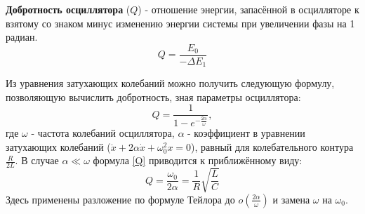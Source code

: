 \documentclass[15pt,a5paper,reqno]{article}
\begin{document}
    \textbf{Добротность осциллятора} ($Q$) - отношение энергии, запасённой в осцилляторе к взятому со знаком минус изменению энергии системы при увеличении фазы на 1 радиан.
    \begin{equation}\label{Q_def}
        Q = \frac{E_0}{-\Delta E_1}
    \end{equation}

    Из уравнения затухающих колебаний можно получить следующую формулу, позволяющую вычислить добротность, зная параметры осциллятора:
    \begin{equation}\label{Q}
        Q = \frac{1}{1 - e^{-\frac{2\alpha}{\omega}}},
    \end{equation}
    где $\omega$ - частота колебаний осциллятора, $\alpha$ - коэффициент в уравнении затухающих колебаний ($\ddot x + 2\alpha\dot x + \omega_0^2 x = 0$), равный для колебательного контура $\frac{R}{2L}$. В случае $\alpha \ll \omega$ формула \eqref{Q} приводится к приближённому виду:
    \begin{equation}\label{Q_approx}
        \boxed{Q = \frac{\omega_0}{2\alpha} = \frac{1}{R}\sqrt{\frac{L}{C}}}
    \end{equation}
    Здесь применены разложение по формуле Тейлора до $o\left(\frac{2\alpha}{\omega}\right)$ и замена $\omega$ на $\omega_0$.
\end{document}
